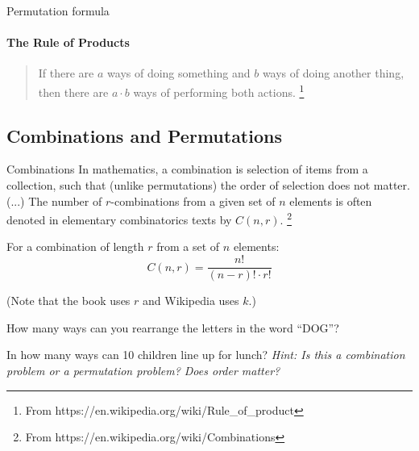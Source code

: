 {\begin{intro}{Permutation formula}
        \paragraph{The Rule of Products}
        
        \begin{quote}
            If there are $a$ ways of doing something and $b$
            ways of doing another thing, then there are $a \cdot b$ ways of performing both actions.
            \footnote{From https://en.wikipedia.org/wiki/Rule\_of\_product}
        \end{quote}
        
    \end{intro}
    
    \subsection{Combinations and Permutations}

    \begin{intro}{Combinations}
        In mathematics, a combination is selection of items from a collection,
        such that (unlike permutations) the order of selection does not matter.
        (...) The number of $r$-combinations from a given set of $n$ elements
        is often denoted in elementary combinatorics texts by $C(n,r)$.
        \footnote{From https://en.wikipedia.org/wiki/Combinations}

        For a combination of length $r$ from a set of $n$ elements:
        $$C(n,r) = \frac{n!}{(n-r)! \cdot r!}$$

        (Note that the book uses $r$ and Wikipedia uses $k$.)
    \end{intro}
    

    \begin{questionNOGRADE}{\thequestion}
        How many ways can you rearrange the letters in the word ``DOG''?
    \end{questionNOGRADE}
    
    \hrulefill
    
    \begin{questionNOGRADE}{\thequestion}
        In how many ways can 10 children line up for lunch?
        \textit{Hint: Is this a combination problem or a permutation problem?
        Does order matter?}
    \end{questionNOGRADE}

    \hrulefill

}
